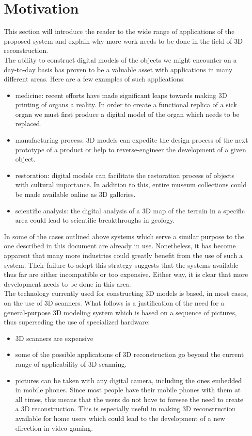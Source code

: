 \documentclass[12pt,a4paper,twoside,openright]{report}
\begin{document}
\section{Motivation}
This section will introduce the reader to the wide range of applications of the proposed system and explain why more work needs to be done in the field of 3D reconstruction.\\
\linebreak 
The ability to construct digital models of the objects we might encounter on a day-to-day basis has proven to be a valuable asset with applications in many different areas. Here are a few examples of such applications:
\begin{itemize}
\item medicine: recent efforts have made significant leaps towards making 3D printing of organs a reality. In order to create a functional replica of a sick organ we must first produce a digital model of the organ which needs to be replaced. 
\item manufacturing process: 3D models can expedite the design process of the next prototype of a product or help to reverse-engineer the development of a given object.   
\item restoration: digital models can facilitate the restoration process of objects with cultural importance. In addition to this, entire museum collections could be made available online as 3D galleries.  
\item scientific analysis: the digital analysis of a 3D map of the terrain in a specific area could lead to scientific breakthroughs in geology.
\end{itemize}
In some of the cases outlined above systems which serve a similar purpose to the one described in this document are already in use. Nonetheless, it has become apparent that many more industries could greatly benefit from the use of such a system. Their failure to adopt this strategy suggests that the systems available thus far are either incompatible or too expensive. Either way, it is clear that more development needs to be done in this area. \\  
\linebreak
The technology currently used for constructing 3D models is based, in most cases, on the use of 3D scanners. What follows is a justification of the need for a general-purpose 3D modeling system which is based on a sequence of pictures, thus superseding the use of specialized hardware:
\begin{itemize}
\item 3D scanners are expensive
\item some of the possible applications of 3D reconstruction go beyond the current range of applicability of 3D scanning. 
\item pictures can be taken with any digital camera, including the ones embedded in mobile phones. Since most people have their mobile phones with them at all times, this means that the users do not have to foresee the need to create a 3D reconstruction. This is especially useful in making 3D reconstruction available for home users which could lead to the development of a new direction in video gaming.
\end{itemize}
\end{document}
